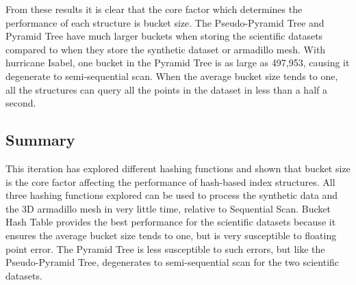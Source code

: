 From these results it is clear that the core factor which determines the performance of each structure is bucket size. The Pseudo-Pyramid Tree and Pyramid Tree have much larger buckets when storing the scientific datasets compared to when they store the synthetic dataset or armadillo mesh. With hurricane Isabel, one bucket in the Pyramid Tree is as large as 497,953, causing it degenerate to semi-sequential scan. When the average bucket size tends to one, all the structures can query all the points in the dataset in less than a half a second.

\subsection{Summary}

This iteration has explored different hashing functions and shown that bucket size is the core factor affecting the performance of hash-based index structures. All three hashing functions explored can be used to process the synthetic data and the 3D armadillo mesh in very little time, relative to Sequential Scan. Bucket Hash Table provides the best performance for the scientific datasets because it ensures the average bucket size tends to one, but is very susceptible to floating point error. The Pyramid Tree is less susceptible to such errors, but like the Pseudo-Pyramid Tree, degenerates to semi-sequential scan for the two scientific datasets.
